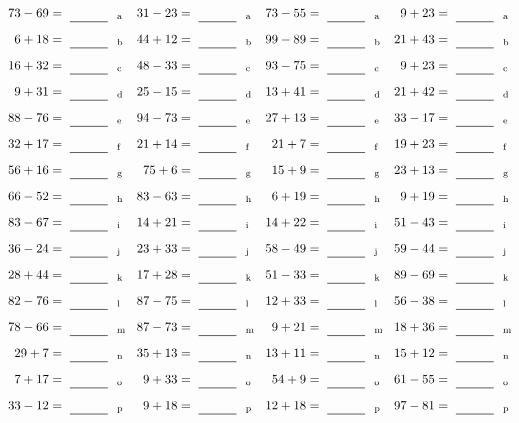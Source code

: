 \documentclass
[
  draft    = true,
  fontsize = 11pt,
  parskip  = half-
]
{scrartcl}
\begin{document}
\clearpage
\begin{align*}
    \pline{73-69}&=\rline{a}
  & \pline{31-23}&=\rline{a}
  & \pline{73-55}&=\rline{a}
  & \pline{9+23}&=\rline{a} \\[1ex]
    \pline{6+18}&=\rline{b}
  & \pline{44+12}&=\rline{b}
  & \pline{99-89}&=\rline{b}
  & \pline{21+43}&=\rline{b} \\[1ex]
    \pline{16+32}&=\rline{c}
  & \pline{48-33}&=\rline{c}
  & \pline{93-75}&=\rline{c}
  & \pline{9+23}&=\rline{c} \\[1ex]
    \pline{9+31}&=\rline{d}
  & \pline{25-15}&=\rline{d}
  & \pline{13+41}&=\rline{d}
  & \pline{21+42}&=\rline{d} \\[1ex]
    \pline{88-76}&=\rline{e}
  & \pline{94-73}&=\rline{e}
  & \pline{27+13}&=\rline{e}
  & \pline{33-17}&=\rline{e} \\[1ex]
    \pline{32+17}&=\rline{f}
  & \pline{21+14}&=\rline{f}
  & \pline{21+7}&=\rline{f}
  & \pline{19+23}&=\rline{f} \\[1ex]
    \pline{56+16}&=\rline{g}
  & \pline{75+6}&=\rline{g}
  & \pline{15+9}&=\rline{g}
  & \pline{23+13}&=\rline{g} \\[1ex]
    \pline{66-52}&=\rline{h}
  & \pline{83-63}&=\rline{h}
  & \pline{6+19}&=\rline{h}
  & \pline{9+19}&=\rline{h} \\[1ex]
    \pline{83-67}&=\rline{i}
  & \pline{14+21}&=\rline{i}
  & \pline{14+22}&=\rline{i}
  & \pline{51-43}&=\rline{i} \\[1ex]
    \pline{36-24}&=\rline{j}
  & \pline{23+33}&=\rline{j}
  & \pline{58-49}&=\rline{j}
  & \pline{59-44}&=\rline{j} \\[1ex]
    \pline{28+44}&=\rline{k}
  & \pline{17+28}&=\rline{k}
  & \pline{51-33}&=\rline{k}
  & \pline{89-69}&=\rline{k} \\[1ex]
    \pline{82-76}&=\rline{l}
  & \pline{87-75}&=\rline{l}
  & \pline{12+33}&=\rline{l}
  & \pline{56-38}&=\rline{l} \\[1ex]
    \pline{78-66}&=\rline{m}
  & \pline{87-73}&=\rline{m}
  & \pline{9+21}&=\rline{m}
  & \pline{18+36}&=\rline{m} \\[1ex]
    \pline{29+7}&=\rline{n}
  & \pline{35+13}&=\rline{n}
  & \pline{13+11}&=\rline{n}
  & \pline{15+12}&=\rline{n} \\[1ex]
    \pline{7+17}&=\rline{o}
  & \pline{9+33}&=\rline{o}
  & \pline{54+9}&=\rline{o}
  & \pline{61-55}&=\rline{o} \\[1ex]
    \pline{33-12}&=\rline{p}
  & \pline{9+18}&=\rline{p}
  & \pline{12+18}&=\rline{p}
  & \pline{97-81}&=\rline{p}
\end{align*}
\end{document}
